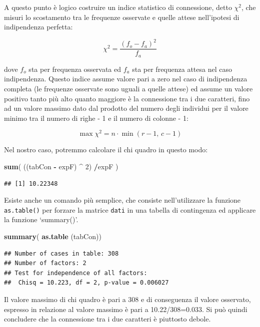 \documentclass[a4paper,12pt,oneside]{book}
\newenvironment{Shaded}{\begin{snugshade}}{\end{snugshade}}
\newcommand{\KeywordTok}[1]{\textcolor[rgb]{0.13,0.29,0.53}{\textbf{#1}}}
\newcommand{\DecValTok}[1]{\textcolor[rgb]{0.00,0.00,0.81}{#1}}
\newcommand{\StringTok}[1]{\textcolor[rgb]{0.31,0.60,0.02}{#1}}
\newcommand{\OperatorTok}[1]{\textcolor[rgb]{0.81,0.36,0.00}{\textbf{#1}}}
\newcommand{\NormalTok}[1]{#1}
\begin{document}
A questo punto è logico costruire un indice statistico di connessione,
detto \(\chi^2\), che misuri lo scostamento tra le frequenze osservate e
quelle attese nell'ipotesi di indipendenza perfetta:

\[\chi ^2  = \frac{{\left( {f_o  - f_a } \right)^2 }}{{f_a }}\]

dove \(f_o\) sta per frequenza osservata ed \(f_a\) sta per frequenza
attesa nel caso indipendenza. Questo indice assume valore pari a zero
nel caso di indipendenza completa (le frequenze osservate sono uguali a
quelle attese) ed assume un valore positivo tanto più alto quanto
maggiore è la connessione tra i due caratteri, fino ad un valore massimo
dato dal prodotto del numero degli individui per il valore minimo tra il
numero di righe - 1 e il numero di colonne - 1:

\[\max \chi ^2  = n \cdot \min (r - 1,\,c - 1)\]

Nel nostro caso, potremmo calcolare il chi quadro in questo modo:

\begin{Shaded}
\begin{Highlighting}[]
\KeywordTok{sum}\NormalTok{( ((tabCon }\OperatorTok{-}\StringTok{ }\NormalTok{expF) }\OperatorTok{^}\StringTok{ }\DecValTok{2}\NormalTok{) }\OperatorTok{/}\NormalTok{expF )}
\end{Highlighting}
\end{Shaded}

\begin{verbatim}
## [1] 10.22348
\end{verbatim}

Esiste anche un comando più semplice, che consiste nell'utilizzare la
funzione \texttt{as.table()} per forzare la matrice \texttt{dati} in una
tabella di contingenza ed applicare la funzione `summary()'.

\begin{Shaded}
\begin{Highlighting}[]
\KeywordTok{summary}\NormalTok{( }\KeywordTok{as.table}\NormalTok{ (tabCon))}
\end{Highlighting}
\end{Shaded}

\begin{verbatim}
## Number of cases in table: 308 
## Number of factors: 2 
## Test for independence of all factors:
##  Chisq = 10.223, df = 2, p-value = 0.006027
\end{verbatim}

Il valore massimo di chi quadro è pari a 308 e di conseguenza il valore
osservato, espresso in relazione al valore massimo è pari a
10.22/308=0.033. Si può quindi concludere che la connessione tra i due
caratteri è piuttosto debole.
\end{document}
